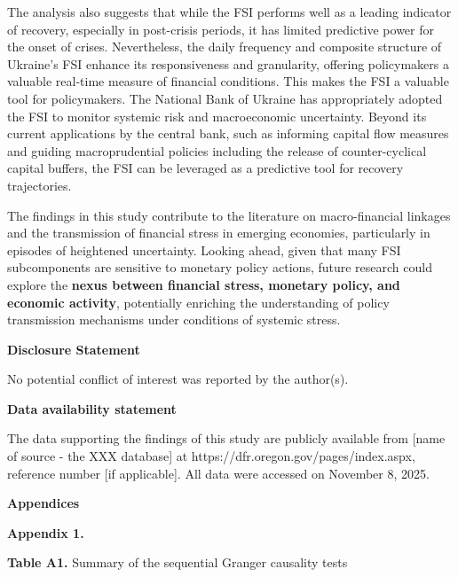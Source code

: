 \documentclass[12pt,preprint,aps,author-year]{revtex4-1}
\begin{document}
The analysis also suggests that while the FSI performs well as a leading indicator of recovery, especially in post-crisis periods, it has limited predictive power for the onset of crises. Nevertheless, the daily frequency and composite structure of Ukraine’s FSI enhance its responsiveness and granularity, offering policymakers a valuable real-time measure of financial conditions. This makes the FSI a valuable tool for policymakers. The National Bank of Ukraine has appropriately adopted the FSI to monitor systemic risk and macroeconomic uncertainty. Beyond its current applications by the central bank, such as informing capital flow measures and guiding macroprudential policies including the release of counter-cyclical capital buffers, the FSI can be leveraged as a predictive tool for recovery trajectories.

The findings in this study contribute to the literature on macro-financial linkages and the transmission of financial stress in emerging economies, particularly in episodes of heightened uncertainty. Looking ahead, given that many FSI subcomponents are sensitive to monetary policy actions, future research could explore the\textbf{ nexus between financial stress, monetary policy, and economic activity}, potentially enriching the understanding of policy transmission mechanisms under conditions of systemic stress.

\textbf{Disclosure Statement}

No potential conflict of interest was reported by the author(s).

\textbf{Data availability statement}

The data supporting the findings of this study are publicly available from [name of source - the XXX database] at https://dfr.oregon.gov/pages/index.aspx, reference number [if applicable]. All data were accessed on November 8, 2025.

\setlength{\bibhang}{0.5in}         %
\setlength{\bibsep}{0.5\baselineskip}



\newpage

\textbf{Appendices}

\textbf{Appendix 1. }

\textbf{Table A1. }Summary of the sequential Granger causality tests
\end{document}
